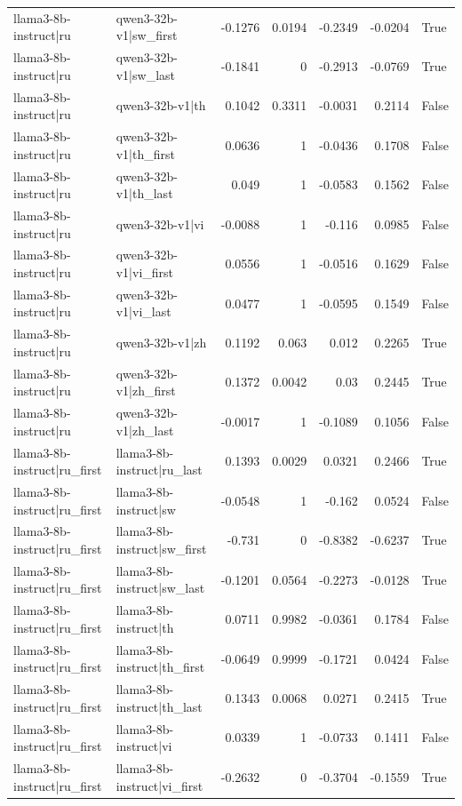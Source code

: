 \begin{table}
\begin{tabular}{l l r r r r l}
llama3-8b-instruct|ru & qwen3-32b-v1|sw_first & -0.1276 & 0.0194 & -0.2349 & -0.0204 & True \\
llama3-8b-instruct|ru & qwen3-32b-v1|sw_last & -0.1841 & 0 & -0.2913 & -0.0769 & True \\
llama3-8b-instruct|ru & qwen3-32b-v1|th & 0.1042 & 0.3311 & -0.0031 & 0.2114 & False \\
llama3-8b-instruct|ru & qwen3-32b-v1|th_first & 0.0636 & 1 & -0.0436 & 0.1708 & False \\
llama3-8b-instruct|ru & qwen3-32b-v1|th_last & 0.049 & 1 & -0.0583 & 0.1562 & False \\
llama3-8b-instruct|ru & qwen3-32b-v1|vi & -0.0088 & 1 & -0.116 & 0.0985 & False \\
llama3-8b-instruct|ru & qwen3-32b-v1|vi_first & 0.0556 & 1 & -0.0516 & 0.1629 & False \\
llama3-8b-instruct|ru & qwen3-32b-v1|vi_last & 0.0477 & 1 & -0.0595 & 0.1549 & False \\
llama3-8b-instruct|ru & qwen3-32b-v1|zh & 0.1192 & 0.063 & 0.012 & 0.2265 & True \\
llama3-8b-instruct|ru & qwen3-32b-v1|zh_first & 0.1372 & 0.0042 & 0.03 & 0.2445 & True \\
llama3-8b-instruct|ru & qwen3-32b-v1|zh_last & -0.0017 & 1 & -0.1089 & 0.1056 & False \\
llama3-8b-instruct|ru_first & llama3-8b-instruct|ru_last & 0.1393 & 0.0029 & 0.0321 & 0.2466 & True \\
llama3-8b-instruct|ru_first & llama3-8b-instruct|sw & -0.0548 & 1 & -0.162 & 0.0524 & False \\
llama3-8b-instruct|ru_first & llama3-8b-instruct|sw_first & -0.731 & 0 & -0.8382 & -0.6237 & True \\
llama3-8b-instruct|ru_first & llama3-8b-instruct|sw_last & -0.1201 & 0.0564 & -0.2273 & -0.0128 & True \\
llama3-8b-instruct|ru_first & llama3-8b-instruct|th & 0.0711 & 0.9982 & -0.0361 & 0.1784 & False \\
llama3-8b-instruct|ru_first & llama3-8b-instruct|th_first & -0.0649 & 0.9999 & -0.1721 & 0.0424 & False \\
llama3-8b-instruct|ru_first & llama3-8b-instruct|th_last & 0.1343 & 0.0068 & 0.0271 & 0.2415 & True \\
llama3-8b-instruct|ru_first & llama3-8b-instruct|vi & 0.0339 & 1 & -0.0733 & 0.1411 & False \\
llama3-8b-instruct|ru_first & llama3-8b-instruct|vi_first & -0.2632 & 0 & -0.3704 & -0.1559 & True \\

\end{tabular}
\end{table}
